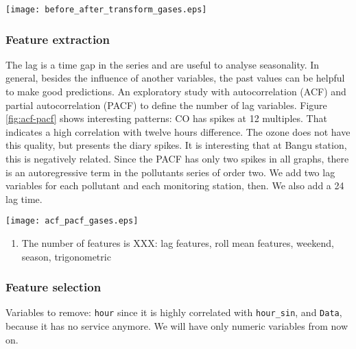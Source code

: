 \begin{figure*}
    \centering
    \texttt{[image: before\_after\_transform\_gases.eps]}
    \caption{Gases distribution before and after the power transform.}
    \label{fig:before-after-transform}
\end{figure*}
 
\subsubsection{Feature extraction}

The lag is a time gap in the series and are useful to analyse seasonality. In
general, besides the influence of another variables, the past values can be
helpful to make good predictions. An exploratory study with autocorrelation
(ACF) and partial autocorrelation (PACF) to define the number of lag
variables. Figure \ref{fig:acf-pacf} shows interesting patterns: CO has spikes
at 12 multiples. That indicates a high correlation with twelve hours
difference. The ozone does not have this quality, but presents the diary
spikes. It is interesting that at Bangu station, this is negatively related.
Since the PACF has only two spikes in all graphs, there is an autoregressive
term in the pollutants series of order two. We add two lag variables for each
pollutant and each monitoring station, then. We also add a 24 lag time.   

\begin{figure*}
    \centering
    \texttt{[image: acf\_pacf\_gases.eps]}
    \caption{ACF and PACF plots for CO, O$_3$, and PM$_{10}$ at Copacabana and
    Bangu stations. }
    \label{fig:acf-pacf}
\end{figure*}



\begin{enumerate}
    \item The number of features is XXX: lag features, roll mean features,
    weekend, season, trigonometric  
\end{enumerate}

\subsubsection{Feature selection}

Variables to remove: {\tt hour} since it is highly correlated with {\tt hour\_sin}, and {\tt Data}, because it has no service anymore. We will have
only numeric variables from now on. 


